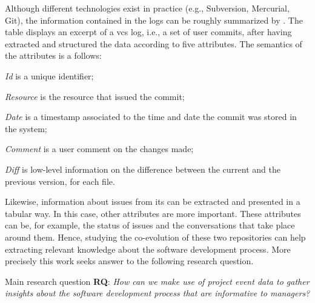 Although different technologies exist in practice (e.g., Subversion, Mercurial, Git), the information contained in the logs can be roughly summarized by . %
The table displays an excerpt of a \gls{vcs} log, i.e., a set of user commits, after having extracted and structured the data according to five attributes. The semantics of the  attributes is a follows: 
\begin{inparaenum}[\itshape i)]
	\item \emph{Id} is a unique identifier;
	\item \emph{Resource} is the resource that issued the commit;
	\item \emph{Date} is a timestamp associated to the time and date the commit was stored in the system;
	\item \emph{Comment} is a user comment on the changes made;
	\item \emph{Diff} is low-level information on the difference between the current and the previous version, for each file.
\end{inparaenum} 



Likewise, information about issues from \gls{its} can be extracted and presented in a tabular way. In this case, other attributes are more important. These attributes can be, for example, the status of issues and the conversations that take place around them. %
Hence, studying the co-evolution of these two repositories can help extracting relevant knowledge about the software development process. 
More precisely this work seeks answer to the following research question. 
\begin{question}{Main research question}
	\textbf{RQ}: \emph{How can we make use of project event data to gather insights about the software development process that are informative to managers?} 
\end{question}

